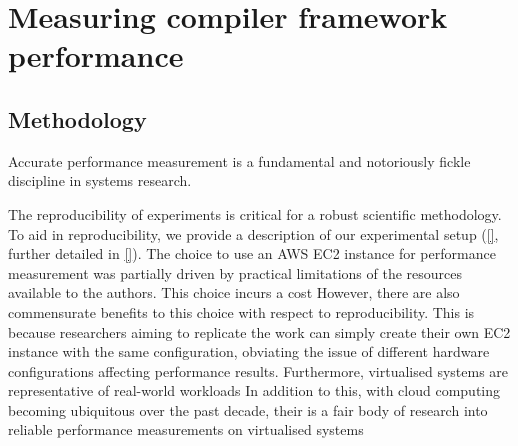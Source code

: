 \chapter{Measuring compiler framework performance}
\label{chap:measuring-compiler-performance}


\section{Methodology}
\label{sec:methodology}


Accurate performance measurement is a fundamental and notoriously fickle discipline in systems research.

The reproducibility of experiments is critical for a robust scientific methodology.
To aid in reproducibility, we provide a description of our experimental setup (\autoref{}, further detailed in \autoref{}).
The choice to use an AWS EC2 instance for performance measurement was partially driven by practical limitations of the resources available to the authors.
This choice incurs a cost
However, there are also commensurate benefits to this choice with respect to reproducibility. This is because researchers aiming to replicate the work can simply create their own EC2 instance with the same configuration, obviating the issue of different hardware configurations affecting performance results.
Furthermore, virtualised systems are representative of real-world workloads
In addition to this, with cloud computing becoming ubiquitous over the past decade, their is a fair body of research into reliable performance measurements on virtualised systems



